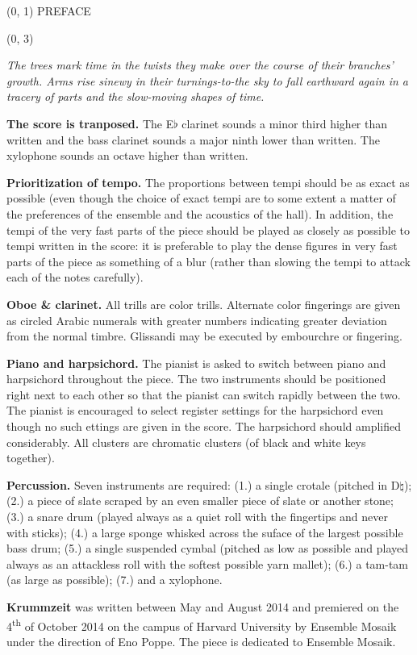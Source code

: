 \documentclass[10pt]{article}
\begin{document}
\begin{textblock}{23}(0, 1)
\center \huge PREFACE
\end{textblock}

\begin{textblock}{23}(0, 3)

\textit{The trees mark time in the twists they make over the course of their
branches' growth. Arms rise sinewy in their turnings-to-the sky to fall
earthward again in a tracery of parts and the slow-moving shapes of time. }

\textbf{The score is tranposed.} The E$\flat$ clarinet sounds a minor third
higher than written and the bass clarinet sounds a major ninth lower than
written. The xylophone sounds an octave higher than written.

\textbf{Prioritization of tempo.} The proportions between tempi should be as
exact as possible (even though the choice of exact tempi are to some extent a
matter of the preferences of the ensemble and the acoustics of the hall). In
addition, the tempi of the very fast parts of the piece should be played as
closely as possible to tempi written in the score: it is preferable to play the
dense figures in very fast parts of the piece as something of a blur (rather
than slowing the tempi to attack each of the notes carefully).

\textbf{Oboe \& clarinet.} All trills are color trills. Alternate color
fingerings are given as circled Arabic numerals with greater numbers indicating
greater deviation from the normal timbre. Glissandi may be executed by
embourchre or fingering.

\textbf{Piano and harpsichord.} The pianist is asked to switch between piano
and harpsichord throughout the piece. The two instruments should be positioned
right next to each other so that the pianist can switch rapidly between the
two. The pianist is encouraged to select register settings for the harpsichord
even though no such ettings are given in the score. The harpsichord should
amplified considerably. All clusters are chromatic clusters (of black and white
keys together).

\textbf{Percussion.} Seven instruments are required: (1.) a single crotale
(pitched in D$\natural$); (2.) a piece of slate scraped by an even smaller
piece of slate or another stone; (3.) a snare drum (played always as a quiet
roll with the fingertips and never with sticks); (4.) a large sponge whisked
across the suface of the largest possible bass drum; (5.) a single suspended
cymbal (pitched as low as possible and played always as an attackless roll with
the softest possible yarn mallet); (6.) a tam-tam (as large as possible); (7.)
and a xylophone.



\textbf{Krummzeit} was written between May and August 2014 and premiered on the
4\textsuperscript{th} of October 2014 on the campus of Harvard University by
Ensemble Mosaik under the direction of Eno Poppe. The piece is dedicated to
Ensemble Mosaik.

\end{textblock}
\end{document}

